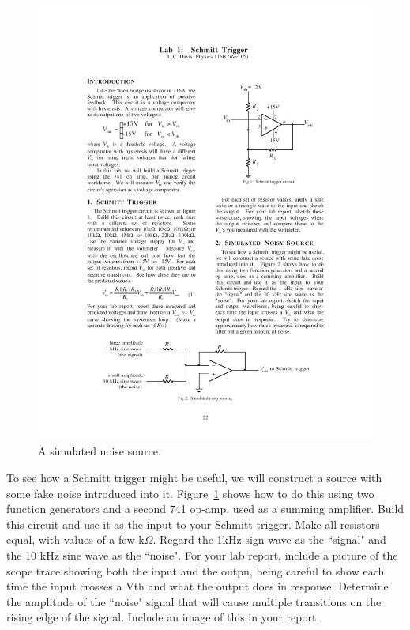 \documentclass[12pt]{article}
\begin{document}
\begin{figure}[!h]
\centerline{\includegraphics[width=6in]{figs/noisy-signal.pdf}}
\caption{A simulated noise source.}
\label{fig:noisy-signal}
\end{figure}

To see how a Schmitt trigger might be useful, we will construct a source with some fake noise introduced into it. Figure~\ref{fig:noisy-signal} shows how to do this using two function generators and a second 741 op-amp, used as a summing amplifier. Build this circuit and use it as the input to your Schmitt trigger. Make all resistors equal, with values of a few k$\Omega$.  Regard the 1kHz sign wave as the ``signal" and the 10 kHz sine wave as the ``noise". For your lab report, include a picture of the scope trace showing
both the input and the outpu, being careful to show each time the input crosses a Vth and what the output does in response. Determine the amplitude of the ``noise" signal that will cause multiple transitions on the rising edge of the signal.  Include an image of this in your report. 
\end{document}
